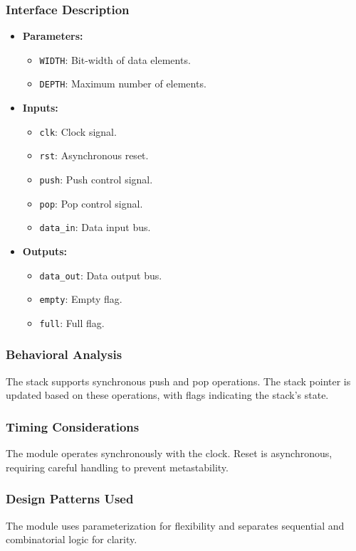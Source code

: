 \documentclass[10pt]{article}
\begin{document}
\subsubsection{Interface Description}
\begin{itemize}
    \item \textbf{Parameters:}
    \begin{itemize}
        \item \texttt{WIDTH}: Bit-width of data elements.
        \item \texttt{DEPTH}: Maximum number of elements.
    \end{itemize}
    \item \textbf{Inputs:}
    \begin{itemize}
        \item \texttt{clk}: Clock signal.
        \item \texttt{rst}: Asynchronous reset.
        \item \texttt{push}: Push control signal.
        \item \texttt{pop}: Pop control signal.
        \item \texttt{data_in}: Data input bus.
    \end{itemize}
    \item \textbf{Outputs:}
    \begin{itemize}
        \item \texttt{data_out}: Data output bus.
        \item \texttt{empty}: Empty flag.
        \item \texttt{full}: Full flag.
    \end{itemize}
\end{itemize}

\subsubsection{Behavioral Analysis}
The stack supports synchronous push and pop operations. The stack pointer is updated based on these operations, with flags indicating the stack's state.

\subsubsection{Timing Considerations}
The module operates synchronously with the clock. Reset is asynchronous, requiring careful handling to prevent metastability.

\subsubsection{Design Patterns Used}
The module uses parameterization for flexibility and separates sequential and combinatorial logic for clarity.
\end{document}
